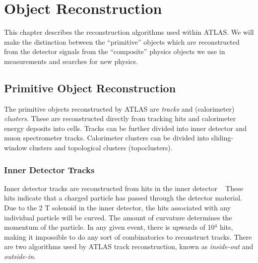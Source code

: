 

\chapter[Object Reconstruction][Top of Page Title]{Object Reconstruction}

This chapter describes the reconstruction algorithms used within ATLAS.
We will make the distinction between the ``primitive'' objects which are reconstructed from the detector signals from the ``composite'' physics objects we use in measurements and searches for new physics.

\section{Primitive Object Reconstruction}

The primitive objects reconstructed by ATLAS are \textit{tracks} and (calorimeter) \textit{clusters}.
These are reconstructed directly from tracking hits and calorimeter energy deposits into cells.
Tracks can be further divided into inner detector and muon spectrometer tracks.
Calorimeter clusters can be divided into sliding-window clusters and topological clusters (topoclusters).
\subsection{Inner Detector Tracks}\label{sec:id_tracks}

Inner detector tracks are reconstructed from hits in the inner detector ~\cite{ATLAS-CONF-2012-042,ATL-PHYS-PUB-2015-051}
These hits indicate that a charged particle has passed through the detector material.
Due to the 2 T solenoid in the inner detector, the hits associated with any individual particle will be curved.
The amount of curvature determines the momentum of the particle.
In any given event, there is upwards of 10$^4$ hits, making it impossible to do any sort of combinatorics to reconstruct tracks.
There are two algorithms used by ATLAS track reconstruction, known as \textit{inside-out} and \textit{outside-in}.

